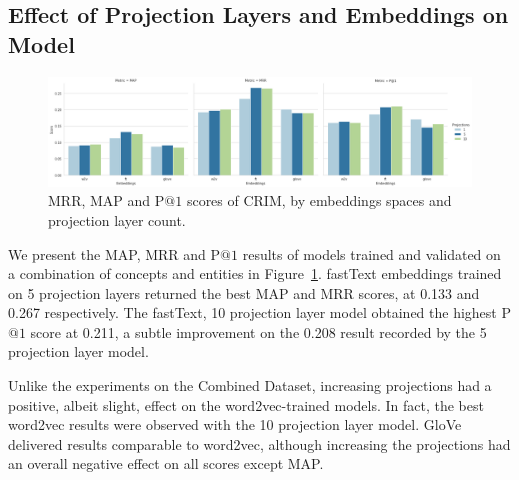 \subsection{Effect of Projection Layers and Embeddings on Model}
\begin{figure}[ht!] 
  \centering
  \includegraphics[width=1.\linewidth]{images/semeval_crim_proj_embed.png}
  \caption{\ac{MRR}, \ac{MAP} and P$@1$ scores of CRIM, by embeddings spaces and projection layer count.}
  \label{fig:semeval_crim_proj_embed}
\end{figure}
We present the \ac{MAP}, \ac{MRR} and P$@1$ results of models trained and validated on a combination of concepts and entities in Figure~\ref{fig:semeval_crim_proj_embed}.  fastText embeddings trained on 5  projection layers returned the best \ac{MAP} and \ac{MRR} scores, at 0.133 and 0.267 respectively.  The fastText, 10 projection layer model obtained the highest P$@1$ score at 0.211, a subtle improvement on the 0.208 result recorded by the 5 projection layer model.

Unlike the experiments on the Combined Dataset, increasing projections had a positive, albeit slight, effect on the word2vec-trained models.  In fact, the best word2vec results were observed with the 10 projection layer model.  GloVe delivered results comparable to word2vec, although increasing the projections had an overall negative effect on all scores except \ac{MAP}.

